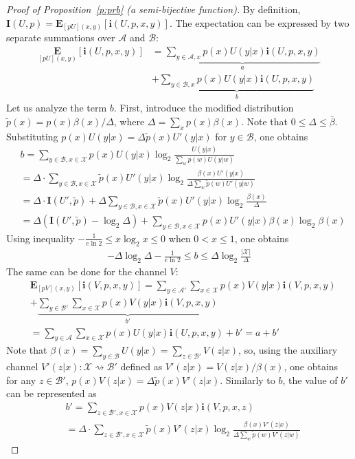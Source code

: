 \documentclass[journal, twocol]{IEEEtran}
\newcommand{\tp}{{\widetilde{p}}}
\newcommand{\mA}{{\mathcal{A}}}
\newcommand{\mB}{{\mathcal{B}}}
\newcommand{\bfE}{{\mathbf{E}}}
\newcommand{\bfI}{{\mathbf{I}}}
\newcommand{\mX}{{\mathcal{X}}}
\newcommand{\br}[1]{{\left({#1}\right)}}
\newcommand{\brsq}[1]{{\left[{#1}\right]}}
\newcommand{\tosq}{\rightsquigarrow}
\newcommand{\bi}{\mathbf{i}}
\newcommand{\obeta}{\overline{\beta}}
\newcommand{\pW}[2]{[{#1}{#2}]}
\begin{document}
\begin{appendices}
\begin{proof}[Proof of Proposition~\ref{p:prb} (a semi-bijective function)]
By definition, $\bfI(U,p)=\bfE_{\pW{p}{U}(x,y)}\brsq{\bi(U,p,x,y)}$.
The expectation can be expressed by two separate summations over $\mA$ and $\mB$:
\begin{align}
\underset{\pW{p}{U}(x,y)}{\bfE}\brsq{\bi(U,p,x,y)}
&=\underbrace{\sum_{y\in \mA,x}p(x) U(y|x)\bi(U,p,x,y)}_{a}
\nonumber\\&
+\underbrace{\sum_{y\in \mB,x}p(x) U(y|x)\bi(U,p,x,y)}_{b}
\end{align}
Let us analyze the term $b$.
First, introduce the modified distribution $\tp(x)=p(x)\beta(x)/\Delta$, where $\Delta=\sum_x p(x)\beta(x)$.
Note that $0\leq \Delta \leq \obeta$.
Substituting $p(x)U(y|x)=\Delta\tp(x)U'(y|x)$ for $y\in\mB$, one obtains
\begin{align*}
&b
=\sum_{y\in\mB,x\in\mX}p(x)U(y|x)\log_2\frac{U(y|x)}{\sum_w p(w)U(y|w)}
\\&
=\Delta\cdot\sum_{y\in\mB,x\in\mX}\tp(x)U'(y|x)
\log_2\frac{\beta(x)U'(y|x)}{\Delta\sum_w \tp(w)U'(y|w)}
\\&
=\Delta\cdot\bfI(U',\tp)+\Delta\sum_{y\in\mB,x\in\mX}\tp(x)U'(y|x)\log_2\frac{\beta(x)}{\Delta}
\\&
= \Delta\br{\bfI(U',\tp)-\log_2 \Delta}+\!\!\!\!\sum_{y\in\mB,x\in\mX}\!\!p(x)U'(y|x)\beta(x)\log_2 \beta(x)
\end{align*}
Using inequality $-\frac{1}{e\ln 2}\leq x\log_2 x \leq 0$ when $0<x\leq 1$, one obtains
\begin{align}
-\Delta\log_2\Delta-\frac{1}{e\ln 2}\leq b \leq \Delta \log_2\frac{|\mX|}{\Delta}
\label{eq:b}
\end{align}
The same can be done for the channel $V$:
\begin{align}
&\bfE_{\pW{p}{V}(x,y)}\brsq{\bi(V,p,x,y)}
=\sum_{y\in \mA'}\sum_{x\in\mX}p(x) V(y|x)\bi(V,p,x,y)
\nonumber\\&
+\underbrace{\sum_{y\in \mB'}\sum_{x\in\mX}p(x) V(y|x)\bi(V,p,x,y)}_{b'}
\nonumber\\&
=\sum_{y\in \mA}\sum_{x\in\mX}p(x) U(y|x)\bi(U,p,x,y)+b'=a+b'
\end{align}
Note that $\beta(x)=\sum_{y\in\mB}U(y|x)=\sum_{z\in\mB'}V(z|x)$, so, using the auxiliary channel $V'(z|x):\mX\tosq\mB'$ defined as $V'(z|x)=V(z|x)/\beta(x)$, one obtains for any $z\in\mB'$, $p(x)V(z|x)=\Delta \tp(x)V'(z|x)$.
Similarly to $b$, the value of $b'$ can be represented as
\begin{align*}
&b'=\sum_{z\in \mB',x\in\mX}p(x) V(z|x)\bi(V,p,x,z)
\\&=\Delta\cdot\!\!\sum_{z\in\mB',x\in\mX}\tp(x)V'(z|x)\log_2\frac{\beta(x)V'(z|x)}{\Delta\sum_w \tp(w)V'(z|w)}

\end{align*}
\end{proof}
\end{appendices}
\end{document}
